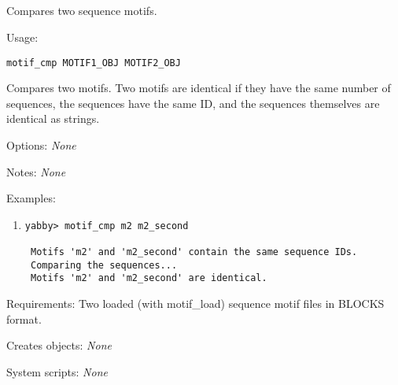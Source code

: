 

\subsection[motif\_cmp]{  }



Compares two sequence motifs.


\begin{description}


\item{Usage:}

{\tt motif\_cmp MOTIF1\_OBJ MOTIF2\_OBJ}

 Compares two motifs.  Two motifs are identical if they have
 the same number of sequences, the sequences have the same
 ID, and the sequences themselves are identical as strings.


\item{Options:} {\em None}


\item{Notes:} {\em None}


\item{Examples:}
\begin{enumerate}

\item
\begin{verbatim}
yabby> motif_cmp m2 m2_second

 Motifs 'm2' and 'm2_second' contain the same sequence IDs.
 Comparing the sequences...
 Motifs 'm2' and 'm2_second' are identical.

\end{verbatim}

\end{enumerate}


\item{Requirements:} Two loaded (with motif\_load) sequence motif files 
                     in BLOCKS format.


\item{Creates objects:} {\em None}


\item{System scripts:} {\em None}

\end{description}


